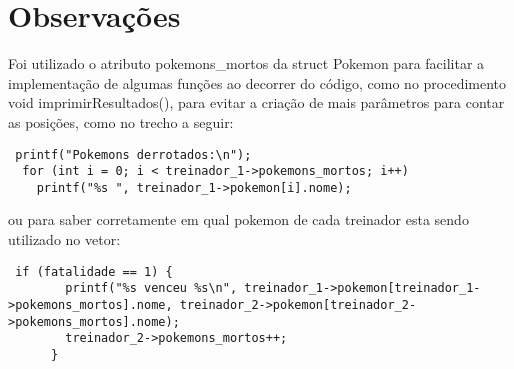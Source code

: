 \documentclass{article}
\begin{document}
\section{Observações}
Foi utilizado o atributo pokemons\_mortos da struct Pokemon para facilitar a implementação de algumas funções ao decorrer do código, como no procedimento void imprimirResultados(), para evitar a criação de mais parâmetros para contar as posições, como no trecho a seguir:
\begin{lstlisting}
 printf("Pokemons derrotados:\n");
  for (int i = 0; i < treinador_1->pokemons_mortos; i++)
    printf("%s ", treinador_1->pokemon[i].nome);

\end{lstlisting}
ou para saber corretamente em qual pokemon de cada treinador esta sendo utilizado no vetor:
\begin{lstlisting}
 if (fatalidade == 1) {
        printf("%s venceu %s\n", treinador_1->pokemon[treinador_1->pokemons_mortos].nome, treinador_2->pokemon[treinador_2->pokemons_mortos].nome);
        treinador_2->pokemons_mortos++;
      }
\end{lstlisting}
\end{document}
